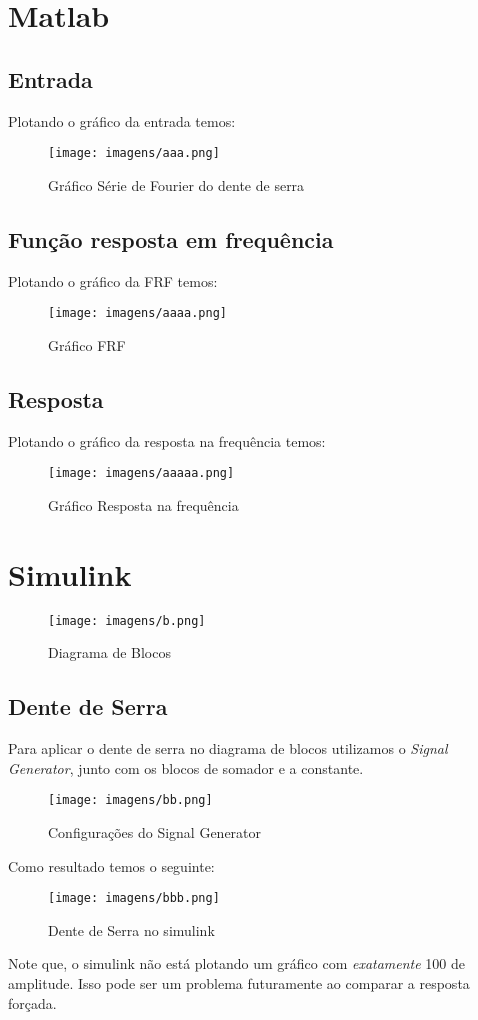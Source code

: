 \documentclass[a4paper, 12pt]{article}
\begin{document}
\newpage
\section{Matlab}
	\subsection{Entrada}
		Plotando o gráfico da entrada temos:
		\begin{figure}[h]
			\center
			\texttt{[image: imagens/aaa.png]}
			\caption{Gráfico Série de Fourier do dente de serra}
		\end{figure}
	\subsection{Função resposta em frequência}
		Plotando o gráfico da FRF temos:
		\begin{figure}[h]
			\center
			\texttt{[image: imagens/aaaa.png]}
			\caption{Gráfico FRF}
		\end{figure}
	\subsection{Resposta}
		Plotando o gráfico da resposta na frequência temos:
		\begin{figure}[h]
			\center
			\texttt{[image: imagens/aaaaa.png]}
			\caption{Gráfico Resposta na frequência}
		\end{figure}

\section{Simulink}
	\begin{figure}[h]
		\center
		\texttt{[image: imagens/b.png]}
		\caption{Diagrama de Blocos}
	\end{figure}
	\subsection{Dente de Serra}
		Para aplicar o dente de serra no diagrama de blocos utilizamos o \textit{Signal Generator}, junto com os blocos de somador e a constante.\\
	\begin{figure}[h]
		\center
		\texttt{[image: imagens/bb.png]}
		\caption{Configurações do Signal Generator}
	\end{figure}
	Como resultado temos o seguinte:
	\begin{figure}[h]
		\center
		\texttt{[image: imagens/bbb.png]}
		\caption{Dente de Serra no simulink}
	\end{figure}
	\newpage
	Note que, o simulink não está plotando um gráfico com \textit{exatamente} 100 de amplitude. Isso pode ser um problema futuramente ao comparar a resposta forçada.
	
\end{document}
